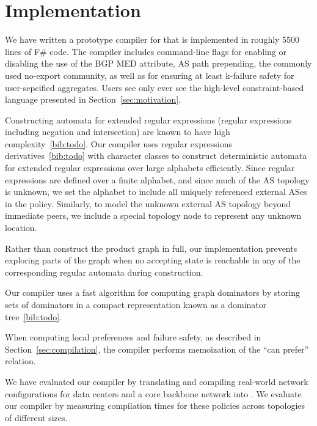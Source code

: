 \section{Implementation}

We have written a prototype compiler for \sysname that is implemented in roughly 5500 lines of F\# code. The compiler includes command-line flags for enabling or disabling the use of the BGP MED attribute, AS path prepending, the commonly used no-export community, as well as for ensuring at least k-failure safety for user-sepcified aggregates. Users see only ever see the high-level constraint-based language presented in Section~\ref{sec:motivation}.


Constructing automata for extended regular expressions (regular expressions including negation and intersection) are known to have high complexity~\ref{bib:todo}. Our \sysname compiler uses regular expressions derivatives~\ref{bib:todo} with character classes to construct deterministic automata for extended regular expressions over large alphabets efficiently. Since regular expressions are defined over a finite alphabet, and since much of the AS topology is unknown, we set the alphabet to include all uniquely referenced external ASes in the policy. Similarly, to model the unknown external AS topology beyond immediate peers, we include a special topology node to represent any unknown location.

Rather than construct the product graph in full, our implementation prevents exploring parts of the graph when no accepting state is reachable in any of the corresponding regular automata during construction.


Our compiler uses a fast algorithm for computing graph dominators by storing sets of dominators in a compact representation known as a dominator tree~\ref{bib:todo}. 


When computing local preferences and failure safety, as described in Section~\ref{sec:compilation}, the compiler performs memoization of the ``can prefer'' relation. 

We have evaluated our compiler by translating and compiling real-world network configurations for data centers and a core backbone network into \sysname. We evaluate our compiler by measuring compilation times for these policies across topologies of different sizes.

